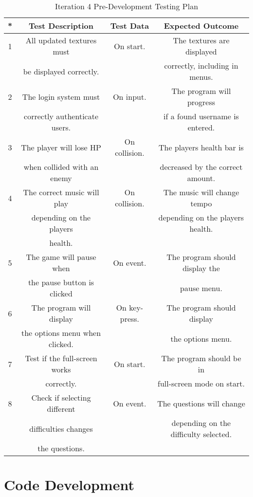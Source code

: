 \documentclass[12pt]{report}
\begin{document}
\begin{table}[H]
    \centering
    \begin{tabular}{|c|c|c|c|}
    \hline
    \textbf{*} & \textbf{Test Description} & \textbf{Test Data} & \textbf{Expected Outcome}\\
    \hline
    1 & All updated textures must & On start. & The textures are displayed \\
    & be displayed correctly. & & correctly, including in menus.\\
    \hline
    2 & The login system must  & On input. & The program will progress\\
      & correctly authenticate users. & & if a found username is entered. \\
    \hline
    3 & The player will lose HP  & On collision. & The players health bar is\\
    & when collided with an enemy & & decreased by the correct amount. \\
    \hline
    4 & The correct music will play & On collision. & The music will change tempo\\
    & depending on the players & & depending on the players health.  \\
    & health. & & \\
    \hline
    5 & The game will pause when & On event. & The program should display the \\
    & the pause button is clicked & & pause menu.\\
    \hline
    6 & The program will display & On key-press. & The program should display\\
    & the options menu when clicked. & & the options menu.\\
    \hline
    7 & Test if the full-screen works & On start. & The program should be in\\
    & correctly. & & full-screen mode on start.\\
    \hline
    8 & Check if selecting different & On event. & The questions will change \\
      & difficulties changes & & depending on the difficulty selected. \\
      & the questions. & & \\
    \hline
    \end{tabular}
    \caption{Iteration 4 Pre-Development Testing Plan}
    \label{TestTable}
\end{table}

\pagebreak

\section{Code Development}
\end{document}
